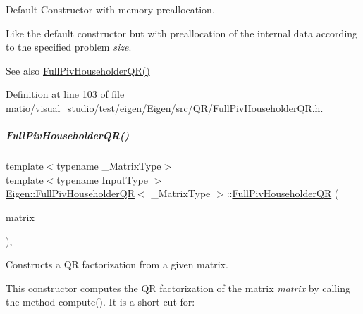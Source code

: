 Default Constructor with memory preallocation. 

Like the default constructor but with preallocation of the internal data according to the specified problem {\itshape size}. \begin{DoxySeeAlso}{See also}
\hyperlink{group___q_r___module_aeb14b4c1eef33128207b40a00bd0bd08}{Full\+Piv\+Householder\+Q\+R()} 
\end{DoxySeeAlso}


Definition at line \hyperlink{matio_2visual__studio_2test_2eigen_2_eigen_2src_2_q_r_2_full_piv_householder_q_r_8h_source_l00103}{103} of file \hyperlink{matio_2visual__studio_2test_2eigen_2_eigen_2src_2_q_r_2_full_piv_householder_q_r_8h_source}{matio/visual\+\_\+studio/test/eigen/\+Eigen/src/\+Q\+R/\+Full\+Piv\+Householder\+Q\+R.\+h}.

\mbox{\label{group___q_r___module_aeeace3abca6b215025e94c3e098b0a97}} 
\subparagraph{\texorpdfstring{Full\+Piv\+Householder\+Q\+R()}{FullPivHouseholderQR()}\hspace{0.1cm}{\footnotesize\ttfamily [7/8]}}
{\footnotesize\ttfamily template$<$typename \+\_\+\+Matrix\+Type$>$ \\
template$<$typename Input\+Type $>$ \\
\hyperlink{group___q_r___module_class_eigen_1_1_full_piv_householder_q_r}{Eigen\+::\+Full\+Piv\+Householder\+QR}$<$ \+\_\+\+Matrix\+Type $>$\+::\hyperlink{group___q_r___module_class_eigen_1_1_full_piv_householder_q_r}{Full\+Piv\+Householder\+QR} (\begin{DoxyParamCaption}\item[{const \hyperlink{group___core___module_struct_eigen_1_1_eigen_base}{Eigen\+Base}$<$ Input\+Type $>$ \&}]{matrix }\end{DoxyParamCaption})\hspace{0.3cm}{\ttfamily [inline]}, {\ttfamily [explicit]}}



Constructs a QR factorization from a given matrix. 

This constructor computes the QR factorization of the matrix {\itshape matrix} by calling the method compute(). It is a short cut for\+:


